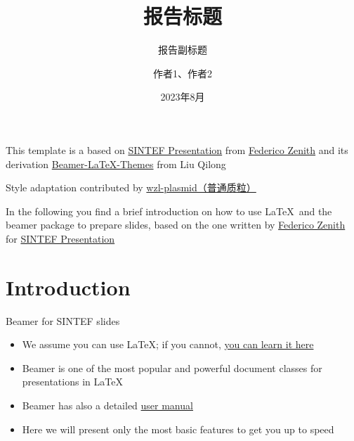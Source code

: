 \documentclass{beamer}
\title{报告标题}
\subtitle{报告副标题}
\author{作者1、作者2}
\date{2023年8月}
\newcommand{\hrefcol}[2]{\textcolor{cyan}{\href{#1}{#2}}}
\begin{document}
\maketitle

\begin{frame}

This template is a based on \hrefcol{https://www.overleaf.com/latex/templates/sintef-presentation/jhbhdffczpnx}{SINTEF Presentation} from \hrefcol{mailto:federico.zenith@sintef.no}{Federico Zenith} and its derivation \hrefcol{https://github.com/TOB-KNPOB/Beamer-LaTeX-Themes}{Beamer-LaTeX-Themes} from Liu Qilong

\vspace{\baselineskip}

Style adaptation contributed by \hrefcol{https://github.com/wzl-plasmid}{wzl-plasmid（普通质粒）}

\vspace{\baselineskip}

In the following you find a brief introduction on how to use \LaTeX\ and the beamer package to prepare slides, based on the one written by \hrefcol{mailto:federico.zenith@sintef.no}{Federico Zenith} for \hrefcol{https://www.overleaf.com/latex/templates/sintef-presentation/jhbhdffczpnx}{SINTEF Presentation}


\end{frame}

\section{Introduction}

\begin{frame}{Beamer for SINTEF slides}
\begin{itemize}
\item We assume you can use \LaTeX; if you cannot,
\hrefcol{http://en.wikibooks.org/wiki/LaTeX/}{you can learn it here}
\item Beamer is one of the most popular and powerful document
classes for presentations in \LaTeX
\item Beamer has also a detailed
\hrefcol{http://www.ctan.org/tex-archive/macros/latex/contrib/beamer/doc/beameruserguide.pdf}{user
 manual}
\item Here we will present only the most basic features to get you up to speed
\end{itemize}
\end{frame}
\end{document}
